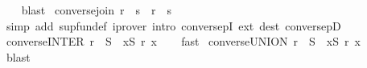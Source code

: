 \begin{isabellebody}
%
\isadelimproof
\ \ %
\endisadelimproof
%
\isatagproof
{}\isamarkupfalse%
\ blast%
\endisatagproof
{\isafoldproof}%
%
\isadelimproof
\isanewline
%
\endisadelimproof
\isanewline
{}\isamarkupfalse%
\ converse{\isacharunderscore}{\kern0pt}join{\isacharcolon}{\kern0pt}\ {\isachardoublequoteopen}{\isacharparenleft}{\kern0pt}r\ {\isasymsqunion}\ s{\isacharparenright}{\kern0pt}{\isasyminverse}{\isasyminverse}\ {\isacharequal}{\kern0pt}\ r{\isasyminverse}{\isasyminverse}\ {\isasymsqunion}\ s{\isasyminverse}{\isasyminverse}{\isachardoublequoteclose}\isanewline
%
\isadelimproof
\ \ %
\endisadelimproof
%
\isatagproof
{}\isamarkupfalse%
\ {\isacharparenleft}{\kern0pt}simp\ add{\isacharcolon}{\kern0pt}\ sup{\isacharunderscore}{\kern0pt}fun{\isacharunderscore}{\kern0pt}def{\isacharparenright}{\kern0pt}\ {\isacharparenleft}{\kern0pt}iprover\ intro{\isacharcolon}{\kern0pt}\ conversepI\ ext\ dest{\isacharcolon}{\kern0pt}\ conversepD{\isacharparenright}{\kern0pt}%
\endisatagproof
{\isafoldproof}%
%
\isadelimproof
\isanewline
%
\endisadelimproof
\isanewline
{}\isamarkupfalse%
\ converse{\isacharunderscore}{\kern0pt}INTER{\isacharcolon}{\kern0pt}\ {\isachardoublequoteopen}{\isacharparenleft}{\kern0pt}{\isasymInter}{\isacharparenleft}{\kern0pt}r\ {\isacharbackquote}{\kern0pt}\ S{\isacharparenright}{\kern0pt}{\isacharparenright}{\kern0pt}{\isasyminverse}\ {\isacharequal}{\kern0pt}\ {\isacharparenleft}{\kern0pt}{\isasymInter}x{\isasymin}S{\isachardot}{\kern0pt}\ {\isacharparenleft}{\kern0pt}r\ x{\isacharparenright}{\kern0pt}{\isasyminverse}{\isacharparenright}{\kern0pt}{\isachardoublequoteclose}\isanewline
%
\isadelimproof
\ \ %
\endisadelimproof
%
\isatagproof
{}\isamarkupfalse%
\ fast%
\endisatagproof
{\isafoldproof}%
%
\isadelimproof
\isanewline
%
\endisadelimproof
\isanewline
{}\isamarkupfalse%
\ converse{\isacharunderscore}{\kern0pt}UNION{\isacharcolon}{\kern0pt}\ {\isachardoublequoteopen}{\isacharparenleft}{\kern0pt}{\isasymUnion}{\isacharparenleft}{\kern0pt}r\ {\isacharbackquote}{\kern0pt}\ S{\isacharparenright}{\kern0pt}{\isacharparenright}{\kern0pt}{\isasyminverse}\ {\isacharequal}{\kern0pt}\ {\isacharparenleft}{\kern0pt}{\isasymUnion}x{\isasymin}S{\isachardot}{\kern0pt}\ {\isacharparenleft}{\kern0pt}r\ x{\isacharparenright}{\kern0pt}{\isasyminverse}{\isacharparenright}{\kern0pt}{\isachardoublequoteclose}\isanewline
%
\isadelimproof
\ \ %
\endisadelimproof
%
\isatagproof
{}\isamarkupfalse%
\ blast%
\endisatagproof
{\isafoldproof}%
%
\isadelimproof
\isanewline
%
\endisadelimproof

\end{isabellebody}
